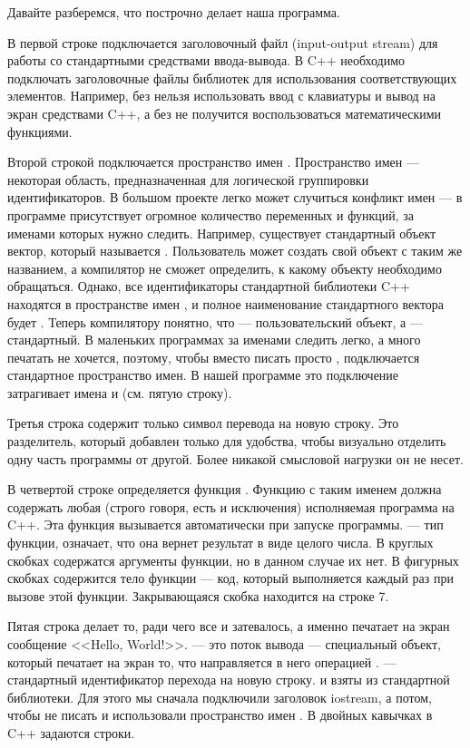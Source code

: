 \documentclass{article}
\begin{document}
Давайте разберемся, что построчно делает наша программа.

В первой строке подключается заголовочный файл  (input-output stream) для работы со стандартными средствами ввода-вывода. В C++ необходимо подключать заголовочные файлы библиотек для использования соответствующих элементов. Например, без  нельзя использовать ввод с клавиатуры и вывод на экран средствами C++, а без  не получится воспользоваться математическими функциями.

Второй строкой подключается пространство имен . Пространство имен --- некоторая область, предназначенная для логической группировки идентификаторов. В большом проекте легко может случиться конфликт имен --- в программе присутствует огромное количество переменных и функций, за именами которых нужно следить. Например, существует стандартный объект вектор, который называется . Пользователь может создать свой объект с таким же названием, а компилятор не сможет определить, к какому объекту необходимо обращаться. Однако, все идентификаторы стандартной библиотеки C++ находятся в пространстве имен , и полное наименование стандартного вектора будет . Теперь компилятору понятно, что  --- пользовательский объект, а  --- стандартный. В маленьких программах за именами следить легко, а много печатать не хочется, поэтому, чтобы вместо  писать просто , подключается стандартное пространство имен. В нашей программе это подключение затрагивает имена  и  (см. пятую строку).

Третья строка содержит только символ перевода на новую строку. Это разделитель, который добавлен только для удобства, чтобы визуально отделить одну часть программы от другой. Более никакой смысловой нагрузки он не несет.

В четвертой строке определяется функция . Функцию с таким именем должна содержать любая (строго говоря, есть и исключения) исполняемая программа на C++. Эта функция вызывается автоматически при запуске программы.  --- тип функции, означает, что она вернет результат в виде целого числа. В круглых скобках содержатся аргументы функции, но в данном случае их нет. В фигурных скобках содержится тело функции --- код, который выполняется каждый раз при вызове этой функции. Закрывающаяся скобка находится на строке 7.

Пятая строка делает то, ради чего все и затевалось, а именно печатает на экран сообщение <<Hello, World!>>.  --- это поток вывода --- специальный объект, который печатает на экран то, что направляется в него операцией \cppword{<{}<}.  --- стандартный идентификатор перехода на новую строку.  и  взяты из стандартной библиотеки. Для этого мы сначала подключили заголовок iostream, а потом, чтобы не писать  и  использовали пространство имен . В двойных кавычках в C++ задаются строки.
\end{document}
